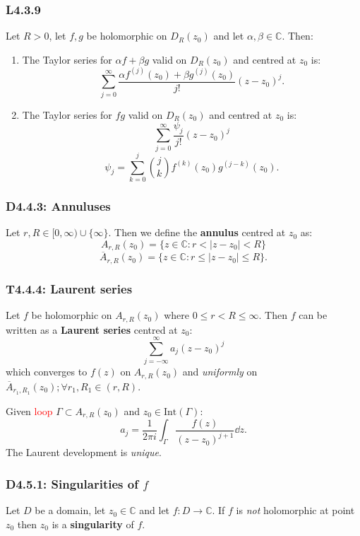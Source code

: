 \documentclass{article}
\begin{document}
\begin{multicols*}{3}
\subsubsection*{L4.3.9}
Let $R>0$, let $f,g$ be holomorphic on $D_R(z_0)$ and let
$\alpha,\beta\in\mathbb{C}$. Then:
\begin{enumerate}
    \item The Taylor series for $\alpha f+\beta g$ valid on $D_R(z_0)$
    and centred at $z_0$ is:
    $$\sum_{j=0}^{\infty}
    \frac{\alpha f^{(j)}(z_0)+\beta g^{(j)}(z_0)}{j!}(z-z_0)^j.$$

    \item The Taylor series for $fg$ valid on $D_R(z_0)$
    and centred at $z_0$ is:
    $$\sum_{j=0}^{\infty}\frac{\psi_j}{j!}(z-z_0)^j$$
    $$\psi_j=\sum_{k=0}^{j}\binom{j}{k}f^{(k)}(z_0)g^{(j-k)}(z_0).$$
\end{enumerate}

\newcolumn

\subsubsection*{D4.4.3: Annuluses}
Let $r,R\in[0,\infty)\cup\{\infty\}$. Then we define the
\textbf{annulus} centred at $z_0$ as:
$$A_{r,R}(z_0)=\{z\in\mathbb{C}:r<|z-z_0|<R\}$$
$$\overline{A}_{r,R}(z_0)=\{z\in\mathbb{C}:r\leq|z-z_0|\leq R\}.$$

\subsubsection*{T4.4.4: Laurent series}
Let $f$ be holomorphic on $A_{r,R}(z_0)$ where $0\leq r<R\leq\infty$.
Then $f$ can be written as a \textbf{Laurent series} centred at $z_0$:
$$\sum_{j=-\infty}^{\infty}a_j(z-z_0)^j$$
which converges to $f(z)$ on $A_{r,R}(z_0)$ and \textit{uniformly}
on $\overline{A}_{r_1,R_1}(z_0);\forall r_1,R_1\in(r,R)$.

Given \textcolor{red}{loop} $\Gamma\subset A_{r,R}(z_0)$
and $z_0\in\text{Int}(\Gamma)$:
$$a_j=\frac{1}{2\pi i}\int_{\Gamma}\frac{f(z)}{(z-z_0)^{j+1}}\dd z.$$
The Laurent development is \textit{unique}.

\subsubsection*{D4.5.1: Singularities of $f$}
Let $D$ be a domain, let $z_0\in\mathbb{C}$ and let
$f:D\rightarrow\mathbb{C}$. If $f$ is \textit{not} holomorphic
at point $z_0$ then $z_0$ is a \textbf{singularity} of $f$.


\end{multicols*}
\end{document}
